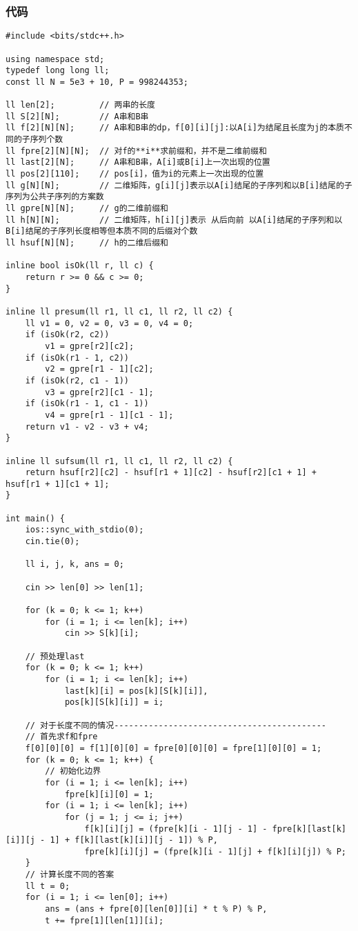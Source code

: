     \subsubsection{代码}
\begin{lstlisting}
#include <bits/stdc++.h>

using namespace std;
typedef long long ll;
const ll N = 5e3 + 10, P = 998244353;

ll len[2];         // 两串的长度
ll S[2][N];        // A串和B串
ll f[2][N][N];     // A串和B串的dp，f[0][i][j]:以A[i]为结尾且长度为j的本质不同的子序列个数
ll fpre[2][N][N];  // 对f的**i**求前缀和，并不是二维前缀和
ll last[2][N];     // A串和B串，A[i]或B[i]上一次出现的位置
ll pos[2][110];    // pos[i]，值为i的元素上一次出现的位置
ll g[N][N];        // 二维矩阵，g[i][j]表示以A[i]结尾的子序列和以B[i]结尾的子序列为公共子序列的方案数
ll gpre[N][N];     // g的二维前缀和
ll h[N][N];        // 二维矩阵，h[i][j]表示 从后向前 以A[i]结尾的子序列和以B[i]结尾的子序列长度相等但本质不同的后缀对个数
ll hsuf[N][N];     // h的二维后缀和

inline bool isOk(ll r, ll c) {
    return r >= 0 && c >= 0;
}

inline ll presum(ll r1, ll c1, ll r2, ll c2) {
    ll v1 = 0, v2 = 0, v3 = 0, v4 = 0;
    if (isOk(r2, c2))
        v1 = gpre[r2][c2];
    if (isOk(r1 - 1, c2))
        v2 = gpre[r1 - 1][c2];
    if (isOk(r2, c1 - 1))
        v3 = gpre[r2][c1 - 1];
    if (isOk(r1 - 1, c1 - 1))
        v4 = gpre[r1 - 1][c1 - 1];
    return v1 - v2 - v3 + v4;
}

inline ll sufsum(ll r1, ll c1, ll r2, ll c2) {
    return hsuf[r2][c2] - hsuf[r1 + 1][c2] - hsuf[r2][c1 + 1] + hsuf[r1 + 1][c1 + 1];
}

int main() {
    ios::sync_with_stdio(0);
    cin.tie(0);

    ll i, j, k, ans = 0;

    cin >> len[0] >> len[1];

    for (k = 0; k <= 1; k++)
        for (i = 1; i <= len[k]; i++)
            cin >> S[k][i];

    // 预处理last
    for (k = 0; k <= 1; k++)
        for (i = 1; i <= len[k]; i++)
            last[k][i] = pos[k][S[k][i]],
            pos[k][S[k][i]] = i;

    // 对于长度不同的情况-------------------------------------------
    // 首先求f和fpre
    f[0][0][0] = f[1][0][0] = fpre[0][0][0] = fpre[1][0][0] = 1;
    for (k = 0; k <= 1; k++) {
        // 初始化边界
        for (i = 1; i <= len[k]; i++)
            fpre[k][i][0] = 1;
        for (i = 1; i <= len[k]; i++)
            for (j = 1; j <= i; j++)
                f[k][i][j] = (fpre[k][i - 1][j - 1] - fpre[k][last[k][i]][j - 1] + f[k][last[k][i]][j - 1]) % P,
                fpre[k][i][j] = (fpre[k][i - 1][j] + f[k][i][j]) % P;
    }
    // 计算长度不同的答案
    ll t = 0;
    for (i = 1; i <= len[0]; i++)
        ans = (ans + fpre[0][len[0]][i] * t % P) % P,
        t += fpre[1][len[1]][i];


\end{lstlisting}
